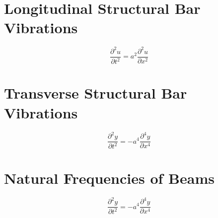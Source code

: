\chapter{Longitudinal Structural Bar Vibrations}
\begin{comment}
Structural Archives
\end{comment}
$$\frac{\partial^2 u}{\partial t^2} = a^2\frac{\partial^2 u}{\partial x^2}$$
\chapter{Transverse Structural Bar Vibrations}
\begin{comment}
Structural Archives
\end{comment}
$$\frac{\partial^2 y}{\partial t^2} = -a^4\frac{\partial^4 y}{\partial x^4}$$
\chapter{Natural Frequencies of Beams}
\begin{comment}
Structural Archives
\end{comment}
$$\frac{\partial^2 y}{\partial t^2} = -a^4\frac{\partial^4 y}{\partial x^4}$$

